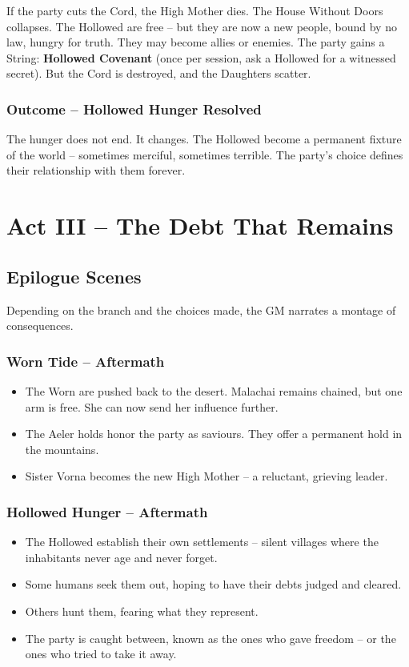\documentclass[10pt,twoside]{book}
\begin{document}
If the party cuts the Cord, the High Mother dies. The House Without Doors collapses. The Hollowed are free -- but they are now a new people, bound by no law, hungry for truth. They may become allies or enemies. The party gains a String: \textbf{Hollowed Covenant} (once per session, ask a Hollowed for a witnessed secret). But the Cord is destroyed, and the Daughters scatter.

\subsection{Outcome -- Hollowed Hunger Resolved}
The hunger does not end. It changes. The Hollowed become a permanent fixture of the world -- sometimes merciful, sometimes terrible. The party's choice defines their relationship with them forever.

\chapter{Act III -- The Debt That Remains}

\section{Epilogue Scenes}
Depending on the branch and the choices made, the GM narrates a montage of consequences.

\subsection{Worn Tide -- Aftermath}
\begin{itemize}
\item The Worn are pushed back to the desert. Malachai remains chained, but one arm is free. She can now send her influence further.
\item The Aeler holds honor the party as saviours. They offer a permanent hold in the mountains.
\item Sister Vorna becomes the new High Mother -- a reluctant, grieving leader.
\end{itemize}

\subsection{Hollowed Hunger -- Aftermath}
\begin{itemize}
\item The Hollowed establish their own settlements -- silent villages where the inhabitants never age and never forget.
\item Some humans seek them out, hoping to have their debts judged and cleared.
\item Others hunt them, fearing what they represent.
\item The party is caught between, known as the ones who gave freedom -- or the ones who tried to take it away.
\end{itemize}
\end{document}
